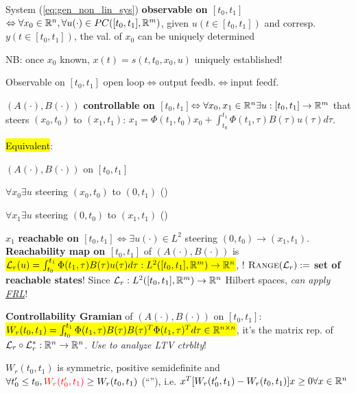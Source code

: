 \begin{Definition}
System (\ref{eq:gen_non_lin_sys}) \textbf{observable on $[t_0,t_1]$}$\Leftrightarrow\forall x_0\in\Reals^n,\forall u(\cdot)\in PC([t_0,t_1],\Reals^m)$, given $u(t\in [t_0,t_1])$ and corresp. $y(t\in [t_0,t_1])$, the val. of $x_0$ can be uniquely determined
\end{Definition}
NB: once $x_0$ known, $x(t)=s(t,t_0,x_0,u)$ uniquely established!

\begin{Theorem}
Observable on $[t_0,t_1]$ open loop$\Leftrightarrow$output feedb.$\Leftrightarrow$input feedf.
\end{Theorem}
\begin{Definition}
$(A(\cdot),B(\cdot))$ \textbf{controllable on $[t_0,t_1]$}$\Leftrightarrow\forall x_0,x_1\in\Reals^n\exists u:[t_0,t_1]\to\Reals^m$ that steers $(x_0,t_0)$ to $(x_1,t_1)$: $x_1=\Phi(t_1,t_0)x_0+\int_{t_0}^{t_1}\Phi(t_1,\tau)B(\tau)u(\tau)d\tau$.
\end{Definition}
\begin{Theorem}
\hl{Equivalent}: \begin{itemize*}
\item $(A(\cdot),B(\cdot))$  on $[t_0,t_1]$
\item $\forall x_0\exists u$ steering $(x_0,t_0)$ to $(0,t_1)$ ()
\item $\forall x_1\exists u$ steering $(0,t_0)$ to $(x_1,t_1)$ ()
\end{itemize*}
\end{Theorem}
\begin{Definition}
$x_1$ \textbf{reachable on $[t_0,t_1]$}$\Leftrightarrow\exists u(\cdot)\in L^2$ steering $(0,t_0)\to (x_1,t_1)$. \textbf{Reachability map on $[t_0,t_1]$} of $(A(\cdot),B(\cdot))$ is \hl{$\mathcal L_r(u)=\int_{t_0}^{t_1}\Phi(t_1,\tau)B(\tau)u(\tau)d\tau:L^2([t_0,t_1],\Reals^m)\to\Reals^n$}, ! $\Range(\mathcal L_r):=$ \textbf{set of reachable states}! Since $\mathcal L_r:L^2([t_0,t_1],\Reals^m)\to\Reals^n$ Hilbert spaces, \textit{can apply \hyperlink{FRL}{FRL}}!
\end{Definition}
\begin{Definition}
\textbf{Controllability Gramian} of $(A(\cdot),B(\cdot))$ on $[t_0,t_1]$: \hl{$W_r(t_0,t_1)=\int_{t_0}^{t_1}\Phi(t_1,\tau)B(\tau)B(\tau)^T\Phi(t_1,\tau)^Td\tau\in\Reals^{n\times n}$}, it's the matrix rep. of $\mathcal L_r\circ\mathcal L_r^*:\Reals^n\to\Reals^n$. \textit{Use to analyze LTV ctrblty}!

\begin{Fact}
$W_r(t_0,t_1)$ is symmetric, positive semidefinite and $\forall t_0'\le t_0,\mc{red}{W_r(t_0',t_1)}\ge W_r(t_0,t_1)$ (``''), i.e. $x^T[W_r(t_0',t_1)-W_r(t_0,t_1)]x\ge 0\forall x\in\Reals^n$
\end{Fact}
\end{Definition}
